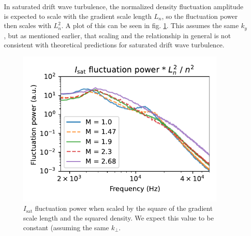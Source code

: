 In saturated drift wave turbulence, the normalized density fluctuation amplitude is expected to scale with the gradient scale length $L_n$, so the fluctuation power then scales with $L_n^2$. A plot of this can be seen in fig. \ref{fig_extra:isat_Ln2_n2}. This assumes the same $k_y$, but as mentioned earlier, that scaling and the relationship in general is not consistent with theoretical predictions for saturated drift wave turbulence.

\begin{figure}
	\centering
	\includegraphics[width=300pt]{figures/extra/isat_fluct_power_Ln2_n2.pdf}
	\caption[$I_\text{sat}$ scaled by $L_n^2 / n^2$]{$I_\text{sat}$ fluctuation power when scaled by the square of the gradient scale length and the squared density. We expect this value to be constant (assuming the same $k_\perp$.}
	\label{fig_extra:isat_Ln2_n2}
\end{figure}


